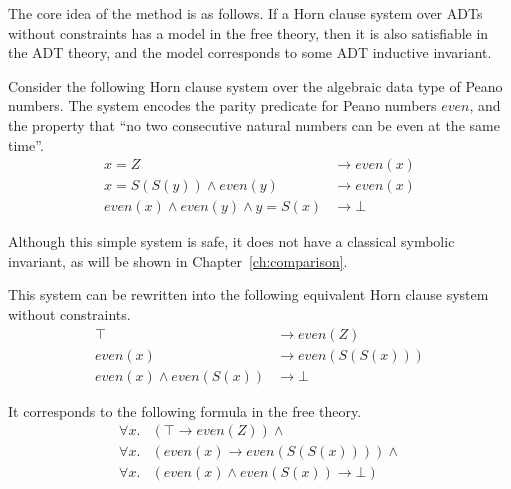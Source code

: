 The core idea of the method is as follows. If a Horn clause system over ADTs without constraints has a model in the free theory, then it is also satisfiable in the ADT theory, and the model corresponds to some ADT inductive invariant.

\begin{example}\label{ex:evenNat}
Consider the following Horn clause system over the algebraic data type of Peano numbers. The system encodes the parity predicate for Peano numbers $even$, and the property that ``no two consecutive natural numbers can be even at the same time''.
\begin{align}
    x = Z &\rightarrow even(x)\\
    x = S(S(y)) \land even(y) &\rightarrow even(x)\\
    even(x) \land even(y) \land y = S(x) &\rightarrow \bot
\end{align}

Although this simple system is safe, it does not have a classical symbolic invariant, as will be shown in Chapter~\ref{ch:comparison}.
\end{example}

This system can be rewritten into the following equivalent Horn clause system without constraints.
\begin{align*}
    \top &\rightarrow even(Z)\\
    even(x) &\rightarrow even(S(S(x)))\\
    even(x) \land even(S(x))&\rightarrow \bot
\end{align*}

It corresponds to the following formula in the free theory.
\begin{align*}
    \forall x. &(\top \rightarrow even(Z))\land \\
    \forall x. &(even(x) \rightarrow even(S(S(x))))\land \\
    \forall x. &(even(x) \land even(S(x))\rightarrow \bot)
\end{align*}

